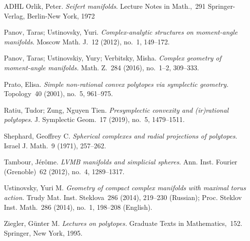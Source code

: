 \documentclass[a4paper]{amsart}
\theoremstyle{definition}
\theoremstyle{remark}
\numberwithin{equation}{section}
\newcommand{\<}{\langle}
\renewcommand{\>}{\rangle}
\begin{document}
\begin{thebibliography}{ADHL}
Orlik, Peter. \emph{Seifert manifolds}.
Lecture Notes in Math.,~291
Springer-Verlag, Berlin-New York, 1972

Panov, Taras; Ustinovsky, Yuri. \emph{Complex-analytic structures
on moment-angle manifolds}. Moscow Math. J.~12 (2012),
no.~1, 149--172.

Panov, Taras; Ustinovskiy, Yury; Verbitsky, Misha.
\emph{Complex geometry of moment-angle manifolds.}
Math. Z.~284 (2016), no.~1--2, 309--333.

Prato, Elisa.
\emph{Simple non-rational convex polytopes via symplectic geometry.}
Topology~40 (2001), no.~5, 961--975.

Ratiu, Tudor; Zung, Nguyen Tien. \emph{Presymplectic convexity and (ir)rational polytopes}. J. Symplectic Geom.~17 (2019), no.~5, 1479--1511.

Shephard, Geoffrey C.
\emph{Spherical complexes and radial projections of polytopes}.
Israel J. Math.~9 (1971), 257--262.

Tambour, J\'er\^ome.
\emph{LVMB manifolds and simplicial spheres}.
Ann. Inst. Fourier (Grenoble)~62 (2012), no.~4, 1289--1317.

Ustinovsky, Yuri M.
\emph{Geometry of compact complex manifolds with maximal torus action.}
Trudy Mat. Inst. Steklova~286 (2014), 219--230 (Russian);
Proc. Steklov Inst. Math.~286 (2014), no.~1, 198--208 (English).

Ziegler, G\"unter M. \emph{Lectures on polytopes.} Graduate Texts in Mathematics,~152. Springer, New York, 1995.
\end{thebibliography}
\end{document}
